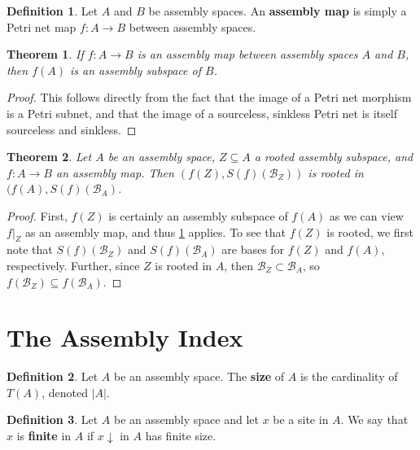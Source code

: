 \documentclass[aps,prd,onecolumn,nofootinbib,letterpaper,preprintnumbers,superscriptaddress,eqsecnum]{revtex4}
\newtheorem{theorem}{Theorem}
\theoremstyle{definition}
\newtheorem{definition}{Definition}
\newcommand{\downset}[1]{#1\!\!\downarrow}
\newcommand{\B}{\mathcal{B}}
\begin{document}
\begin{definition}\label{def:assembly-map}
    Let $A$ and $B$ be assembly spaces.
    An \textbf{assembly map} is simply a Petri net map $f: A \rightarrow B$ between assembly spaces.
\end{definition}

\begin{theorem}\label{lem:assembly-image-is-subspace}
    If $f : A \rightarrow B$ is an assembly map between assembly spaces $A$ and $B$, then $f(A)$ is an assembly subspace of $B$.
\end{theorem}
\begin{proof}
    This follows directly from the fact that the image of a Petri net morphism is a Petri subnet, and that the image of a sourceless, sinkless Petri net is itself sourceless and sinkless.
\end{proof}

\begin{theorem}\label{thm:rooted-image}
    Let $A$ be an assembly space, $Z \subseteq A$ a rooted assembly subspace, and $f : A \rightarrow B$ an assembly map.
    Then $(f(Z), S(f)(\B_Z))$ is rooted in $(f(A), S(f)(\B_A)$.
\end{theorem}
\begin{proof}
    First, $f(Z)$ is certainly an assembly subspace of $f(A)$ as we can view $f|_Z$ as an assembly map, and thus \cref{lem:assembly-image-is-subspace} applies.
    To see that $f(Z)$ is rooted, we first note that $S(f)(\B_Z)$ and $S(f)(\B_A)$ are bases for $f(Z)$ and $f(A)$, respectively.
    Further, since $Z$ is rooted in $A$, then $\B_Z \subset \B_A$, so $f(\B_Z) \subseteq f(\B_A)$.
\end{proof}

\section{The Assembly Index}

\begin{definition}\label{def:size}
    Let $A$ be an assembly space.
    The \textbf{size} of $A$ is the cardinality of $T(A)$, denoted $|A|$.
\end{definition}

\begin{definition}\label{def:finiteness}
    Let $A$ be an assembly space and let $x$ be a site in $A$.
    We say that $x$ is \textbf{finite} in $A$ if $\downset{x}$ in $A$ has finite size.
\end{definition}
\end{document}

